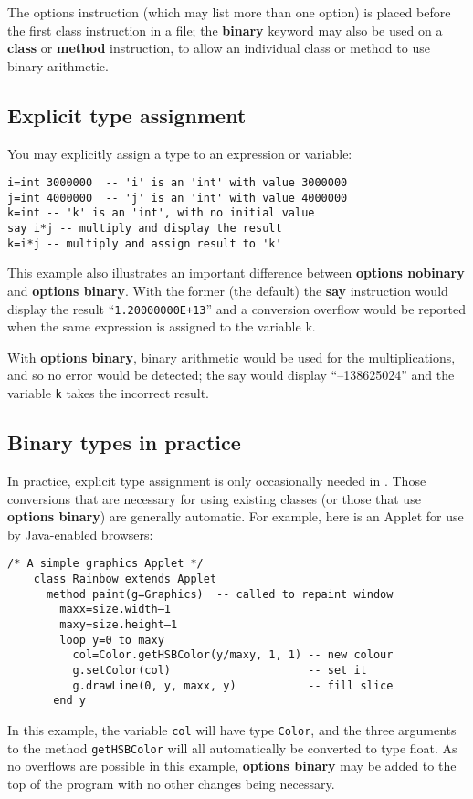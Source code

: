 The options instruction (which may list more than one option) is placed before the first class instruction in a file; the \textbf{binary} keyword may also be used on a \textbf{class} or \textbf{method} instruction, to allow an individual class or method to use binary arithmetic.
\subsection{Explicit type assignment}
You may explicitly assign a type to an expression or variable:
\begin{lstlisting}[label=assigningtype,caption=Assigning Type]
i=int 3000000  -- 'i' is an 'int' with value 3000000
j=int 4000000  -- 'j' is an 'int' with value 4000000
k=int -- 'k' is an 'int', with no initial value
say i*j -- multiply and display the result
k=i*j -- multiply and assign result to 'k'
\end{lstlisting}
This example also illustrates an important difference between
\textbf{options nobinary} and \textbf{options binary}. With the former
(the default) the \textbf{say} instruction would display the result
“\texttt{1.20000000E+13}” and a conversion overflow would be reported
when the same expression is assigned to the variable k.

With \textbf{options binary}, binary arithmetic would be used for the multiplications, and so no error would be detected; the say would display “–138625024” and the variable \texttt{k} takes the incorrect result.
\subsection{Binary types in practice}
In practice, explicit type assignment is only occasionally needed in
\nr{}. Those conversions that are necessary for using existing
classes (or those that use \textbf{options binary}) are generally
automatic. For example, here is an Applet for use by Java-enabled
browsers:
\begin{lstlisting}[label=asimpleapplet,caption=A Simple Applet]
    /* A simple graphics Applet */
    class Rainbow extends Applet
      method paint(g=Graphics)  -- called to repaint window
        maxx=size.width–1
        maxy=size.height–1
        loop y=0 to maxy
          col=Color.getHSBColor(y/maxy, 1, 1) -- new colour
          g.setColor(col)                     -- set it
          g.drawLine(0, y, maxx, y)           -- fill slice
       end y
\end{lstlisting}
In this example, the variable \texttt{col} will have type \texttt{Color}, and the three
arguments to the method \texttt{getHSBColor} will all automatically be
converted to type float. As no overflows are possible in this example,
\textbf{options binary} may be added to the top of the program with no other
changes being necessary.

